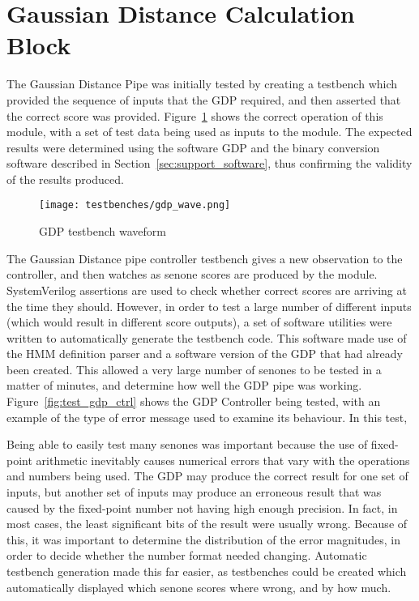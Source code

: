 \section{Gaussian Distance Calculation Block} %
\label{sec:gaussian_distance_calculation_testing}
	The Gaussian Distance Pipe was initially tested by creating a testbench which provided the sequence of inputs that the GDP required, and then asserted that the correct score was provided.  Figure~\ref{fig:test_gdp} shows the correct operation of this module, with a set of test data being used as inputs to the module.  The expected results were determined using the software GDP and the binary conversion software described in Section~\ref{sec:support_software}, thus confirming the validity of the results produced.

	\begin{figure}[tb]
		\begin{center}
			\texttt{[image: testbenches/gdp\_wave.png]}
		\end{center}
		\caption{GDP testbench waveform}
		\label{fig:test_gdp}
	\end{figure}
	
	The Gaussian Distance pipe controller testbench gives a new observation to the controller, and then watches as senone scores are produced by the module.  SystemVerilog assertions are used to check whether correct scores are arriving at the time they should.  However, in order to test a large number of different inputs (which would result in different score outputs), a set of software utilities were written to automatically generate the testbench code.  This software made use of the HMM definition parser and a software version of the GDP that had already been created.  This allowed a very large number of senones to be tested in a matter of minutes, and determine how well the GDP pipe was working.  Figure~\ref{fig:test_gdp_ctrl} shows the GDP Controller being tested, with an example of the type of error message used to examine its behaviour.  In this test, %

	Being able to easily test many senones was important because the use of fixed-point arithmetic inevitably causes numerical errors that vary with the operations and numbers being used.  The GDP may produce the correct result for one set of inputs, but another set of inputs may produce an erroneous result that was caused by the fixed-point number not having high enough precision.  In fact, in most cases, the least significant bits of the result were usually wrong.  Because of this, it was important to determine the distribution of the error magnitudes, in order to decide whether the number format needed changing.  Automatic testbench generation made this far easier, as testbenches could be created which automatically displayed which senone scores where wrong, and by how much.

